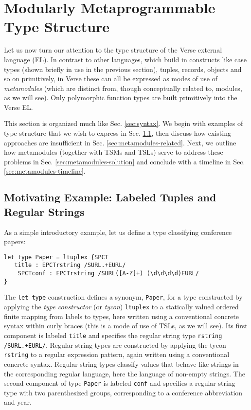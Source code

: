 
\section{Modularly Metaprogrammable Type Structure}\label{sec:metamodules}
Let us now turn our attention to the type structure of the Verse external language (EL). In contrast to other languages, which build in constructs like case types (shown briefly in use in the previous section), tuples, records, objects and so on primitively, in Verse these can all be expressed as modes of use of \emph{metamodules} (which are distinct from, though conceptually related to, {modules}, as we will see). Only polymorphic function types are built primitively into the Verse EL.

This section is organized much like Sec. \ref{sec:syntax}. We begin with examples of type structure that we wish to express in Sec. \ref{sec:metamodules-example}, then discuss how existing approaches are insufficient in Sec. \ref{sec:metamodules-related}. Next, we outline how metamodules (together with TSMs and TSLs) serve to address these problems in Sec. \ref{sec:metamodules-solution} and conclude with a timeline in Sec. \ref{sec:metamodules-timeline}.

\subsection{Motivating Example: Labeled Tuples and Regular Strings}\label{sec:metamodules-example}
As a simple introductory example, let us define a type classifying conference papers:
\begin{lstlisting}[numbers=none]
let type Paper = ltuplex {SPCT
   title : EPCTrstring /SURL.+EURL/
    SPCTconf : EPCTrstring /SURL([A-Z]+) (\d\d\d\d)EURL/
}
\end{lstlisting}
The \lstinline{let type} construction defines a synonym, \lstinline{Paper}, for a type constructed by applying the \emph{type constructor} (or \emph{tycon}) \lstinline{ltuplex} to a statically valued ordered finite mapping from labels to types, here written using a conventional concrete syntax within curly braces (this is a mode of use of TSLs, as we will see). Its first component is labeled \lstinline{title} and specifies the regular string type \lstinline{rstring /SURL.+EURL/}. Regular string types are constructed by applying the tycon \lstinline{rstring} to a regular expression pattern, again written using a conventional concrete syntax. Regular string types classify values that behave like strings in the corresponding regular language, here the language of non-empty strings. The second component of type \lstinline{Paper} is labeled \lstinline{conf} and specifies a regular string type with two parenthesized groups, corresponding to a conference abbreviation and year.

